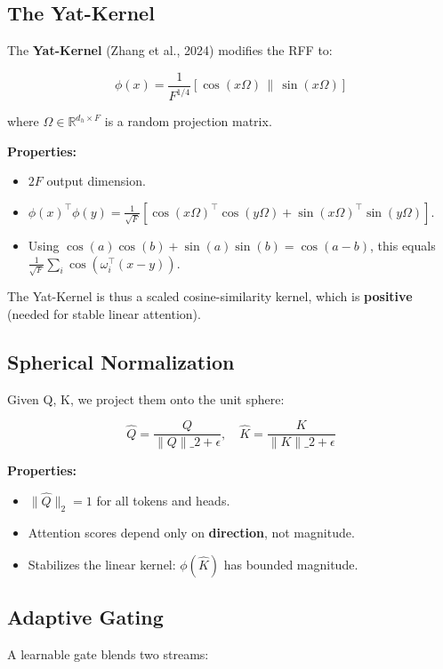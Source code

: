 \subsection{The Yat-Kernel}

The \textbf{Yat-Kernel} (Zhang et al., 2024) modifies the RFF to:

\[
\phi(x) = \frac{1}{F^{1/4}} [\cos(x \Omega) \,\|\, \sin(x \Omega)]
\]

where $\Omega \in \mathbb{R}^{d_h \times F}$ is a random projection matrix.

\textbf{Properties:}

\begin{itemize}
\item $2F$ output dimension.
\item $\phi(x)^\top \phi(y) = \frac{1}{\sqrt{F}} [\cos(x\Omega)^\top \cos(y\Omega) + \sin(x\Omega)^\top \sin(y\Omega)]$.
\item Using $\cos(a)\cos(b) + \sin(a)\sin(b) = \cos(a - b)$, this equals
  $\frac{1}{\sqrt{F}} \sum_i \cos(\omega_i^\top (x - y))$.

\end{itemize}
The Yat-Kernel is thus a scaled cosine-similarity kernel, which is 
\textbf{positive} (needed for stable linear attention).

\subsection{Spherical Normalization}

Given Q, K, we project them onto the unit sphere:

\[
\hat{Q} = \frac{Q}{\|Q\|\_2 + \epsilon}, \quad
\hat{K} = \frac{K}{\|K\|\_2 + \epsilon}
\]

\textbf{Properties:}

\begin{itemize}
\item $\|\hat{Q}\|_2 = 1$ for all tokens and heads.
\item Attention scores depend only on \textbf{direction}, not magnitude.
\item Stabilizes the linear kernel: $\phi(\hat{K})$ has bounded magnitude.

\end{itemize}
\subsection{Adaptive Gating}

A learnable gate blends two streams:

